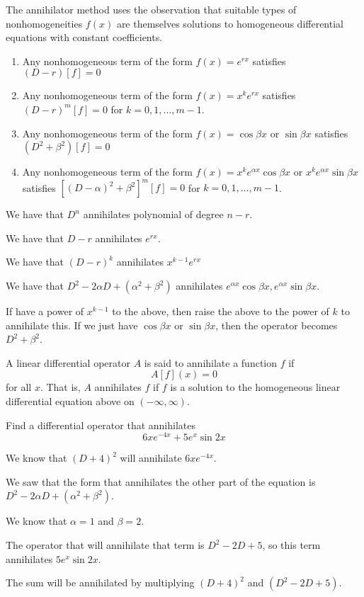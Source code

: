 \documentclass[../diffeq.tex]{subfiles}
\begin{document}
The annihilator method uses the observation that suitable types of nonhomogeneities $f(x)$ are themselves solutions to homogeneous differential equations with constant coefficients.
\begin{enumerate}
    \item Any nonhomogeneous term of the form $f(x)=e^{rx}$ satisfies $(D-r)[f] =0$
    \item Any nonhomogeneous term of the form $f(x)=x^ke^{rx}$ satisfies $(D-r)^m[f]=0$ for $k=0,1,\dots,m-1$.
    \item Any nonhomogeneous term of the form $f(x)=\cos \beta x$ or $\sin\beta x$ satisfies $(D^2+\beta^2)[f]=0$
    \item Any nonhomogeneous term of the form $f(x)=x^ke^{\alpha x}\cos \beta x$ or $x^ke^{\alpha x}\sin \beta x$ satisfies $[(D-\alpha)^2+\beta^2]^m[f]=0$ for $k=0,1,\dots,m-1$.
\end{enumerate}

We have that $D^n$ annihilates polynomial of degree $n-r$.

We have that $D-r$ annihilates $e^{rx}$.

We have that $(D-r)^k$ annihilates $x^{k-1}e^{rx}$

We have that $D^2-2\alpha D+(\alpha^2 +\beta^2)$ annihilates $e^{\alpha x}\cos \beta x, e^{\alpha x}\sin \beta x$.

If have a power of $x^{k-1}$ to the above, then raise the above to the power of $k$ to annihilate this. If we just have $\cos \beta x$ or $\sin\beta x$, then the operator becomes $D^2+\beta ^2$.

\begin{definition}
    A linear differential operator $A$ is said to annihilate a function $f$ if 
    \[ A[f](x)=0 \]
    for all $x$. That is, $A$ annihilates $f$ if $f$ is a solution to the homogeneous linear differential equation above on $(-\infty,\infty)$.
\end{definition}

\begin{example}
    Find a differential operator that annihilates 
    \[ 6xe^{-4x}+5e^x\sin 2x \]

    We know that $(D+4)^2$ will annihilate $6xe^{-4x}$. 

    We saw that the form that annihilates the other part of the equation is $D^2-2\alpha D+(\alpha^2+\beta^2)$.

    We know that $\alpha = 1$ and $\beta = 2$.

    The operator that will annihilate that term is $D^2-2D+5$, so this term annihilates $5e^x\sin 2x$.

    The sum will be annihilated by multiplying $(D+4)^2$ and $(D^2-2D+5)$.
\end{example}
\end{document}

